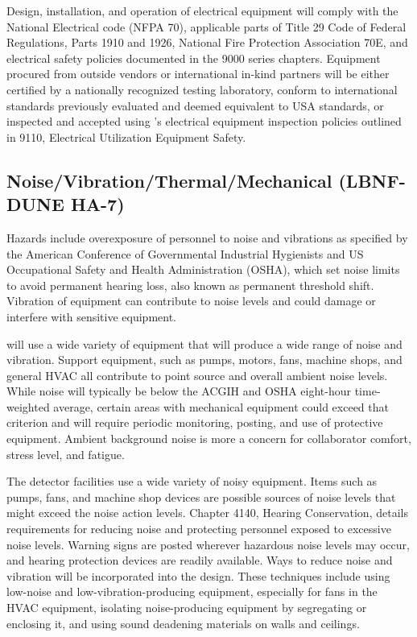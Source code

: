 Design, installation, and operation of electrical equipment will
comply with the National Electrical code (NFPA 70), applicable parts
of Title 29 Code of Federal Regulations, Parts 1910 and 1926, National
Fire Protection Association 70E, and \fnal electrical safety policies
documented in the  9000 series chapters. Equipment
procured from outside vendors or international in-kind partners will
be either certified by a nationally recognized testing laboratory,
conform to international standards previously evaluated and deemed
equivalent to USA standards, or inspected and accepted using \fnal's
electrical equipment inspection policies outlined in 
9110, Electrical Utilization Equipment Safety.


\subsection{Noise/Vibration/Thermal/Mechanical (LBNF-DUNE HA-7)}

Hazards include overexposure of personnel to noise and vibrations as
specified by the American Conference of Governmental Industrial
Hygienists and US Occupational Safety and Health Administration
(OSHA), which set noise limits to avoid permanent hearing loss, also
known as permanent threshold shift. Vibration of equipment can
contribute to noise levels and could damage or interfere with
sensitive equipment.

 will use a wide variety of equipment that
will produce a wide range of noise and vibration. Support equipment,
such as pumps, motors, fans, machine shops, and general HVAC all
contribute to point source and overall ambient noise levels. While
noise will typically be below the ACGIH and OSHA eight-hour time-weighted
average, certain areas with mechanical equipment could exceed that
criterion and will require periodic monitoring, posting, and use of
protective equipment. Ambient background noise is more a concern for
collaborator comfort, stress level, and fatigue.

The detector facilities use a wide variety of noisy equipment. Items such as pumps,
fans, and machine shop devices %
are possible sources of
noise levels that might exceed the \fnal noise action
levels.  Chapter 4140, Hearing Conservation, details
requirements for reducing noise and protecting personnel exposed to
excessive noise levels. Warning signs are posted wherever hazardous
noise levels may occur, and hearing protection devices are readily
available. Ways to reduce noise and vibration will be incorporated
into the  design. These techniques include
using low-noise and low-vibration-producing equipment, especially for fans in
the HVAC equipment, isolating noise-producing equipment by segregating
or enclosing it, and using sound deadening materials on walls and
ceilings.

